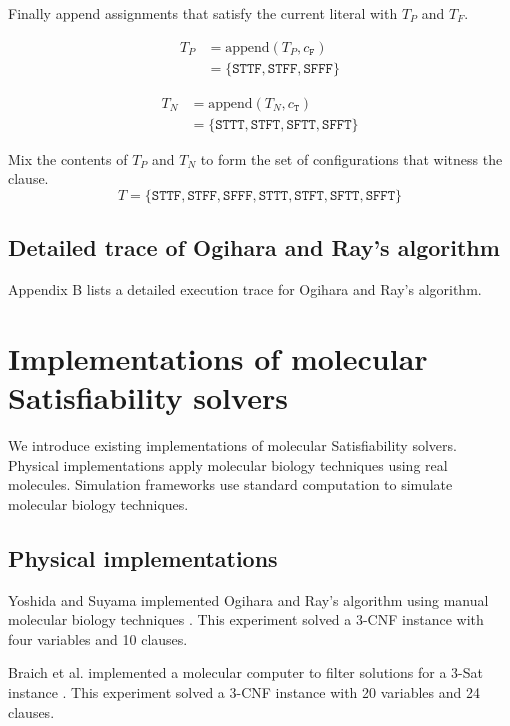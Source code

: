 Finally append assignments that satisfy the current literal with $T_P$ and $T_F$.

\begin{align*}
T_P &= \text{append}(T_P, c_{\texttt{F}}) \\
	&= \{ \texttt{STTF}, \texttt{STFF}, \texttt{SFFF} \}
\end{align*}

\begin{align*}
T_N &= \text{append}(T_N, c_{\texttt{T}}) \\
	&= \{ \texttt{STTT}, \texttt{STFT}, \texttt{SFTT}, \texttt{SFFT}\}
\end{align*}


\noindent Mix the contents of $T_P$ and $T_N$ to form the set of configurations that witness the clause. 
\[
T = \{ \texttt{STTF}, \texttt{STFF}, \texttt{SFFF},  \texttt{STTT}, \texttt{STFT}, \texttt{SFTT}, \texttt{SFFT}\}
\]
		
	\subsection{Detailed trace of Ogihara and Ray's algorithm}
	
Appendix B lists a detailed execution trace for Ogihara and Ray's algorithm.

\section{Implementations of molecular {\sc Satisfiability} solvers}

We introduce existing implementations of molecular {\sc Satisfiability} solvers.  Physical implementations apply molecular biology techniques using real molecules.  Simulation frameworks use standard computation to simulate molecular biology techniques.

	\subsection{Physical implementations}
	

Yoshida and Suyama implemented Ogihara and Ray's algorithm using manual molecular biology techniques \cite{dnaBasedImplemetation_Yoshida2000}.  This experiment solved a 3-CNF instance with four variables and 10 clauses.

Braich et al. implemented a molecular computer to filter solutions for a 3-{\sc Sat} instance \cite{Braich02solutionof}.  This experiment solved a 3-CNF instance with 20 variables and 24 clauses.
	
